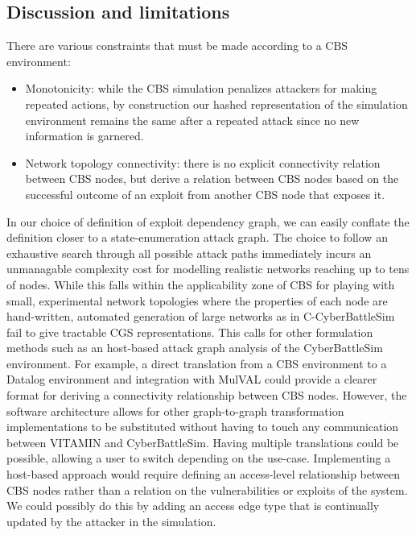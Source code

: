 \subsection{Discussion and limitations}
There are various constraints that must be made according to a CBS environment:
\begin{itemize}
    \item Monotonicity: while the CBS simulation penalizes attackers for making repeated actions, by construction our hashed representation of the simulation environment remains the same after a repeated attack since no new information is garnered.
    \item Network topology connectivity: there is no explicit connectivity relation between CBS nodes, but derive a relation between CBS nodes based on the successful outcome of an exploit from another CBS node that exposes it.
\end{itemize}

In our choice of definition of exploit dependency graph, we can easily conflate the definition closer to a state-enumeration attack graph. The choice to follow an exhaustive search through all possible attack paths immediately incurs an unmanagable complexity cost for modelling realistic networks reaching up to tens of nodes. While this falls within the applicability zone of CBS for playing with small, experimental network topologies where the properties of each node are hand-written, automated generation of large networks as in C-CyberBattleSim fail to give tractable CGS representations. This calls for other formulation methods such as an host-based attack graph analysis \cite{host-based} of the CyberBattleSim environment. For example, a direct translation from a CBS environment to a Datalog environment and integration with MulVAL could provide a clearer format for deriving a connectivity relationship between CBS nodes. However, the software architecture allows for other graph-to-graph transformation implementations to be substituted without having to touch any communication between VITAMIN and CyberBattleSim. Having multiple translations could be possible, allowing a user to switch depending on the use-case. Implementing a host-based approach would require defining an access-level relationship between CBS nodes rather than a relation on the vulnerabilities or exploits of the system. We could possibly do this by adding an access edge type that is continually updated by the attacker in the simulation.